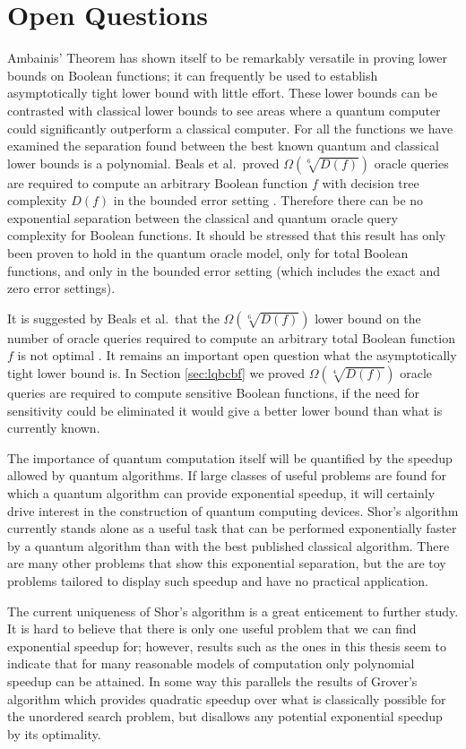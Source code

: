\chapter{Open Questions}
\label{ch:open}

Ambainis' Theorem has shown itself to be remarkably versatile in
proving lower bounds on Boolean functions; it can frequently be used
to establish asymptotically tight lower bound with little effort.
These lower bounds can be contrasted with classical lower bounds to
see areas where a quantum computer could significantly outperform a
classical computer.  For all the functions we have examined the
separation found between the best known quantum and classical lower
bounds is a polynomial.  Beals et al.\ proved $\Omega(\sqrt[6]{D(f)})$
oracle queries are required to compute an arbitrary Boolean function
$f$ with decision tree complexity $D(f)$ in the bounded error setting
\cite{beals98quantum}.  Therefore there can be no exponential
separation between the classical and quantum oracle query complexity
for Boolean functions.  It should be stressed that this result has
only been proven to hold in the quantum oracle model, only for total
Boolean functions, and only in the bounded error setting (which
includes the exact and zero error settings).

It is suggested by Beals et al.\ that the
$\Omega(\sqrt[6]{D(f)})$ lower bound on the number of
oracle queries required to compute an arbitrary total Boolean function
$f$ is not optimal \cite{beals98quantum}.  It remains an important
open question what the asymptotically tight lower bound is.  In
Section \ref{sec:lqbcbf} we proved $\Omega(\sqrt[4]{D(f)})$
oracle queries are required to compute sensitive Boolean functions, if
the need for sensitivity could be eliminated it would give a better
lower bound than what is currently known.

The importance of quantum computation itself will be quantified by the
speedup allowed by quantum algorithms.  If large classes of useful
problems are found for which a quantum algorithm can provide
exponential speedup, it will certainly drive interest in the
construction of quantum computing devices.  Shor's algorithm currently
stands alone as a useful task that can be performed exponentially
faster by a quantum algorithm than with the best published classical
algorithm.  There are many other problems that show this exponential
separation, but the are toy problems tailored to display such speedup
and have no practical application.

The current uniqueness of Shor's algorithm is a great enticement to
further study.  It is hard to believe that there is only one useful
problem that we can find exponential speedup for; however, results
such as the ones in this thesis seem to indicate that for many
reasonable models of computation only polynomial speedup can be
attained.  In some way this parallels the results of Grover's
algorithm which provides quadratic speedup over what is classically
possible for the unordered search problem, but disallows any potential
exponential speedup by its optimality.

